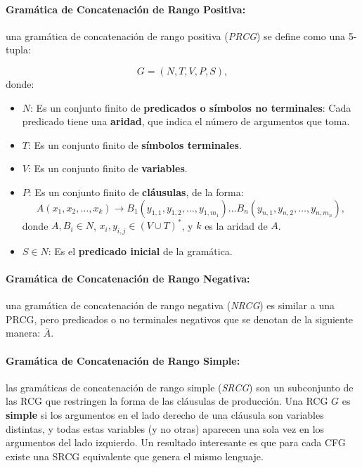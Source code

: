 \documentclass[12pt]{article}
\begin{document}
\paragraph{Gramática de Concatenación de Rango Positiva:} una gramática de concatenación de rango positiva (\textit{PRCG}) se define como una 5-tupla:

\[
    G = (N, T, V, P, S),
\]
donde:

\begin{itemize}
    \item $N$: Es un conjunto finito de \textbf{predicados o símbolos no terminales}: Cada predicado tiene una \textbf{aridad}, que indica el número de argumentos que toma.
    \item $T$: Es un conjunto finito de \textbf{símbolos terminales}.
    \item $V$: Es un conjunto finito de \textbf{variables}.
    \item $P$: Es un conjunto finito de \textbf{cláusulas}, de la forma:
          \[
              A(x_1, x_2, \ldots, x_k) \to B_1(y_{1,1}, y_{1,2}, \ldots, y_{1,m_1}) \ldots B_n(y_{n,1}, y_{n,2}, \ldots, y_{n,m_n}),
          \]
          donde $A, B_i \in N$, $x_i, y_{i,j} \in (V \cup T)^*$, y $k$ es la aridad de $A$.
    \item $S \in N$: Es el \textbf{predicado inicial} de la gramática.
\end{itemize}

\paragraph{Gramática de Concatenación de Rango Negativa:} una gramática de concatenación de rango negativa (\textit{NRCG}) es similar a una PRCG, pero predicados o no terminales negativos que se denotan de la siguiente manera: $\overline{A}$.

\paragraph{Gramática de Concatenación de Rango Simple:} las gramáticas de concatenación de rango simple (\textit{SRCG}) son un subconjunto de las RCG que restringen la forma de las cláusulas de producción.
Una RCG $G$ es \textbf{simple} si los argumentos en el lado derecho de una cláusula son variables distintas, y todas estas variables (y no otras) aparecen una sola vez en los argumentos del lado izquierdo.
Un resultado interesante es que para cada CFG existe una SRCG equivalente que genera el mismo lenguaje.
\end{document}
